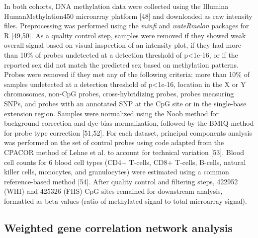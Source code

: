 \documentclass[]{article}
\theoremstyle{definition}
\theoremstyle{definition}
\theoremstyle{definition}
\theoremstyle{remark}
\begin{document}
In both cohorts, DNA methylation data were collected using the Illumina
HumanMethylation450 microarray platform {[}48{]} and downloaded as raw
intensity files. Preprocessing was performed using the \emph{minfi} and
\emph{wateRmelon} packages for R {[}49,50{]}. As a quality control step,
samples were removed if they showed weak overall signal based on visual
inspection of an intensity plot, if they had more than 10\% of probes
undetected at a detection threshold of p\textless{}1e-16, or if the
reported sex did not match the predicted sex based on methylation
patterns. Probes were removed if they met any of the following criteria:
more than 10\% of samples undetected at a detection threshold of
p\textless{}1e-16, location in the X or Y chromosomes, non-CpG probes,
cross-hybridizing probes, probes measuring SNPs, and probes with an
annotated SNP at the CpG site or in the single-base extension region.
Samples were normalized using the Noob method for background correction
and dye-bias normalization, followed by the BMIQ method for probe type
correction {[}51,52{]}. For each dataset, principal components analysis
was performed on the set of control probes using code adapted from the
CPACOR method of Lehne et al. to account for technical
variation {[}53{]}. Blood cell counts for 6 blood cell types (CD4+
T-cells, CD8+ T-cells, B-cells, natural killer cells, monocytes, and
granulocytes) were estimated using a common reference-based
method {[}54{]}. After quality control and filtering steps, 422952 (WHI)
and 425326 (FHS) CpG sites remained for downstream analysis, formatted
as beta values (ratio of methylated signal to total microarray signal).

\subsection{Weighted gene correlation network
analysis}\label{weighted-gene-correlation-network-analysis}
\end{document}
